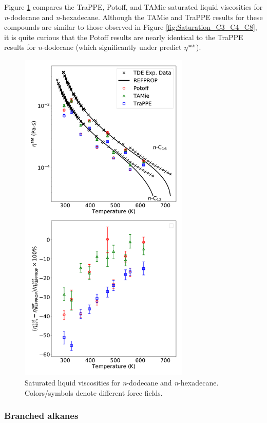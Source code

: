 \documentclass[preprint,review,12pt]{elsarticle}
\begin{document}
	Figure \ref{fig:Saturation_C12_C16} compares the TraPPE, Potoff, and TAMie saturated liquid viscosities for \textit{n}-dodecane and \textit{n}-hexadecane. Although the TAMie and TraPPE results for these compounds are similar to those observed in Figure \ref{fig:Saturation_C3_C4_C8}, it is quite curious that the Potoff results are nearly identical to the TraPPE results for \textit{n}-dodecane (which significantly under predict $\eta^{\rm sat}$). 
	
	\begin{figure}[htb!]
		\centering
		\includegraphics[width=3.2in]{compare_force_fields_C12_C16.pdf}
		\caption{Saturated liquid viscosities for \textit{n}-dodecane and \textit{n}-hexadecane. Colors/symbols denote different force fields.}
		\label{fig:Saturation_C12_C16}
	\end{figure} 
	
	\subsubsection{Branched alkanes}
	
\end{document}
